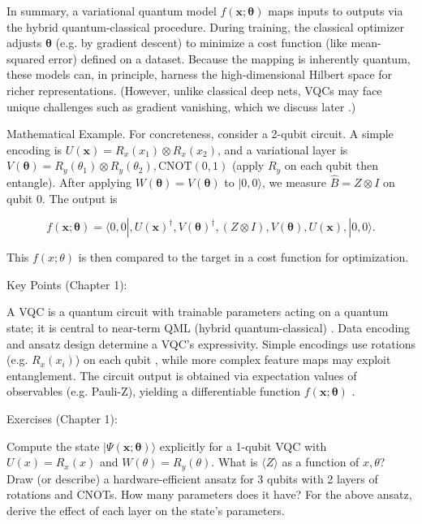 In summary, a variational quantum model $f(\mathbf{x};\boldsymbol\theta)$ maps inputs to outputs via the hybrid quantum-classical procedure.  During training, the classical optimizer adjusts $\boldsymbol\theta$ (e.g. by gradient descent) to minimize a cost function (like mean-squared error) defined on a dataset.  Because the mapping is inherently quantum, these models can, in principle, harness the high-dimensional Hilbert space for richer representations.  (However, unlike classical deep nets, VQCs may face unique challenges such as gradient vanishing, which we discuss later .)



Mathematical Example. For concreteness, consider a 2-qubit circuit.  A simple encoding is $U(\mathbf{x})=R_x(x_1)\otimes R_x(x_2)$, and a variational layer is $V(\boldsymbol\theta)=R_y(\theta_1)\otimes R_y(\theta_2), \text{CNOT}(0,1)$ (apply $R_y$ on each qubit then entangle).  After applying $W(\boldsymbol\theta)=V(\boldsymbol\theta)$ to $|0,0\rangle$, we measure $\hat B=Z\otimes I$ on qubit 0.  The output is

$$f(\mathbf{x};\boldsymbol\theta) = \langle 0,0|,U(\mathbf{x})^\dagger,V(\boldsymbol\theta)^\dagger, (Z\otimes I), V(\boldsymbol\theta),U(\mathbf{x}),|0,0\rangle.$$

This $f(x;\theta)$ is then compared to the target in a cost function for optimization.



Key Points (Chapter 1):



A VQC is a quantum circuit with trainable parameters acting on a quantum state; it is central to near-term QML (hybrid quantum-classical) .
Data encoding and ansatz design determine a VQC’s expressivity.  Simple encodings use rotations (e.g. $R_x(x_i)$) on each qubit , while more complex feature maps may exploit entanglement.
The circuit output is obtained via expectation values of observables (e.g. Pauli-Z), yielding a differentiable function $f(\mathbf{x};\boldsymbol\theta)$ .




Exercises (Chapter 1):



Compute the state $|\Psi(\mathbf{x};\boldsymbol\theta)\rangle$ explicitly for a 1-qubit VQC with $U(x)=R_x(x)$ and $W(\theta)=R_y(\theta)$. What is $\langle Z\rangle$ as a function of $x,\theta$?
Draw (or describe) a hardware-efficient ansatz for 3 qubits with 2 layers of rotations and CNOTs. How many parameters does it have?
For the above ansatz, derive the effect of each layer on the state’s parameters.






